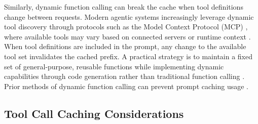 \documentclass{article}
\theoremstyle{plain}
\theoremstyle{definition}
\theoremstyle{remark}
\begin{document}

Similarly, dynamic function calling can break the cache when tool definitions change between requests. Modern agentic systems increasingly leverage dynamic tool discovery through protocols such as the Model Context Protocol (MCP) \cite{modelcontextprotocol_intro}, where available tools may vary based on connected servers or runtime context \citep{lumer2025toolagentselectionsurvey}. When tool definitions are included in the prompt, any change to the available tool set invalidates the cached prefix. A practical strategy is to maintain a fixed set of general-purpose, reusable functions while implementing dynamic capabilities through code generation rather than traditional function calling \cite{ji2025manus_context_engineering,wang2024executablecodeactionselicit}. Prior methods of dynamic function calling can prevent prompt caching usage \citep{lumer2024toolshedscaletoolequippedagents,lumer2025scalemcpdynamicautosynchronizingmodel}.

\subsection{Tool Call Caching Considerations}
\label{subsec:tool_caching}

\end{document}
